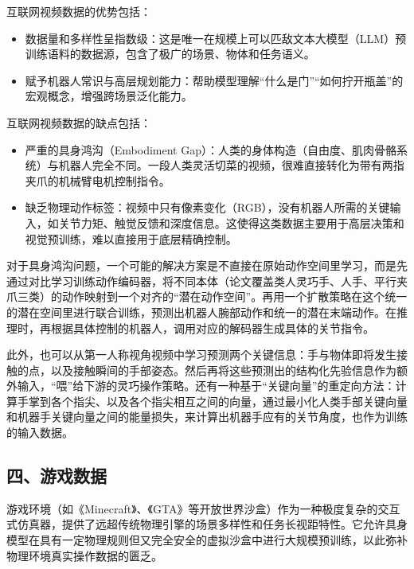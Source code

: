 互联网视频数据的优势包括：

\begin{itemize}
\tightlist
\item
  数据量和多样性呈指数级：这是唯一在规模上可以匹敌文本大模型（LLM）预训练语料的数据源，包含了极广的场景、物体和任务语义。
\item
  赋予机器人常识与高层规划能力：帮助模型理解``什么是门''``如何拧开瓶盖''的宏观概念，增强跨场景泛化能力。
\end{itemize}

互联网视频数据的缺点包括：

\begin{itemize}
\tightlist
\item
  严重的具身鸿沟（Embodiment Gap）：人类的身体构造（自由度、肌肉骨骼系统）与机器人完全不同。一段人类灵活切菜的视频，很难直接转化为带有两指夹爪的机械臂电机控制指令。
\item
  缺乏物理动作标签：视频中只有像素变化（RGB），没有机器人所需的关键输入，如关节力矩、触觉反馈和深度信息。这使得这类数据主要用于高层决策和视觉预训练，难以直接用于底层精确控制。
\end{itemize}

对于具身鸿沟问题，一个可能的解决方案是不直接在原始动作空间里学习，而是先通过对比学习训练动作编码器，将不同本体（论文覆盖类人灵巧手、人手、平行夹爪三类）的动作映射到一个对齐的``潜在动作空间''。再用一个扩散策略在这个统一的潜在空间里进行联合训练，预测出机器人腕部动作和统一的潜在末端动作。在推理时，再根据具体控制的机器人，调用对应的解码器生成具体的关节指令。

此外，也可以从第一人称视角视频中学习预测两个关键信息：手与物体即将发生接触的点，以及接触瞬间的手部姿态。然后再将这些预测出的结构化先验信息作为额外输入，``喂''给下游的灵巧操作策略。还有一种基于``关键向量''的重定向方法：计算手掌到各个指尖、以及各个指尖相互之间的向量，通过最小化人类手部关键向量和机器手关键向量之间的能量损失，来计算出机器手应有的关节角度，也作为训练的输入数据。

\hypertarget{ux56dbux6e38ux620fux6570ux636e}{%
\subsection{四、游戏数据}\label{ux56dbux6e38ux620fux6570ux636e}}

游戏环境（如《Minecraft》、《GTA》等开放世界沙盒）作为一种极度复杂的交互式仿真器，提供了远超传统物理引擎的场景多样性和任务长视距特性。它允许具身模型在具有一定物理规则但又完全安全的虚拟沙盒中进行大规模预训练，以此弥补物理环境真实操作数据的匮乏。

